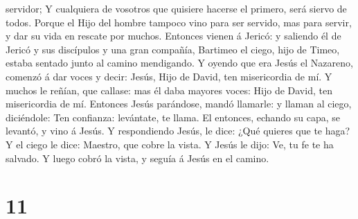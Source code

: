 servidor;  Y cualquiera de vosotros que quisiere hacerse el
primero, será siervo de todos.  Porque el Hijo del hombre
tampoco vino para ser servido, mas para servir, y dar su vida en rescate
por muchos.  Entonces vienen á Jericó: y saliendo él de
Jericó y sus discípulos y una gran compañía, Bartimeo el ciego, hijo de
Timeo, estaba sentado junto al camino mendigando.  Y oyendo
que era Jesús el Nazareno, comenzó á dar voces y decir: Jesús, Hijo de
David, ten misericordia de mí.  Y muchos le reñían, que
callase: mas él daba mayores voces: Hijo de David, ten misericordia de
mí.  Entonces Jesús parándose, mandó llamarle: y llaman al
ciego, diciéndole: Ten confianza: levántate, te llama.  El
entonces, echando su capa, se levantó, y vino á Jesús.  Y
respondiendo Jesús, le dice: ¿Qué quieres que te haga? Y el ciego le
dice: Maestro, que cobre la vista.  Y Jesús le dijo: Ve, tu
fe te ha salvado. Y luego cobró la vista, y seguía á Jesús en el camino.

\hypertarget{section-10}{%
\section{11}\label{section-10}}


